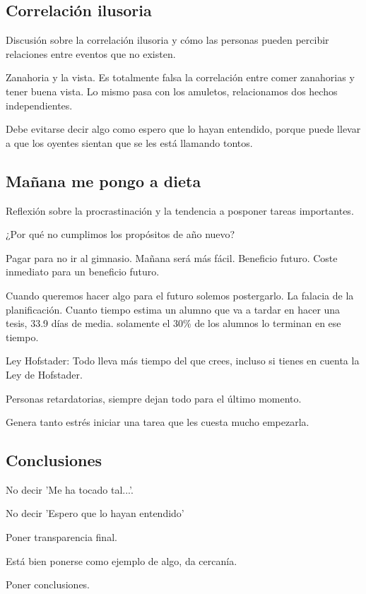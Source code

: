 \documentclass[12pt, a4paper, twoside]{article}
\begin{document}
\subsection{Correlación ilusoria}
Discusión sobre la correlación ilusoria y cómo las personas pueden percibir relaciones entre eventos que no existen.

Zanahoria y la vista. Es totalmente falsa la correlación entre comer zanahorias y tener buena vista. Lo mismo pasa con los 
amuletos, relacionamos dos hechos independientes.

Debe evitarse decir algo como espero que lo hayan entendido, porque puede llevar a que los oyentes sientan que se les está llamando tontos.


\subsection{Mañana me pongo a dieta}
Reflexión sobre la procrastinación y la tendencia a posponer tareas importantes.

¿Por qué no cumplimos los propósitos de año nuevo?

Pagar para no ir al gimnasio. Mañana será más fácil. Beneficio futuro. 
Coste inmediato para un beneficio futuro.

Cuando queremos hacer algo para el futuro solemos postergarlo. La falacia de la planificación. 
Cuanto tiempo estima un alumno que va a tardar en hacer una tesis, 33.9 días de media. solamente el 30\%
de los alumnos lo terminan en ese tiempo.

Ley Hofstader: Todo lleva más tiempo del que crees, incluso si tienes en cuenta la Ley de Hofstader.

Personas retardatorias, siempre dejan todo para el último momento.

Genera tanto estrés iniciar una tarea que les cuesta mucho empezarla.

\subsection{Conclusiones}

No decir 'Me ha tocado tal...'.


No decir 'Espero que lo hayan entendido'

Poner transparencia final.

Está bien ponerse como ejemplo de algo, da cercanía.

Poner conclusiones.

\newpage
\end{document}

